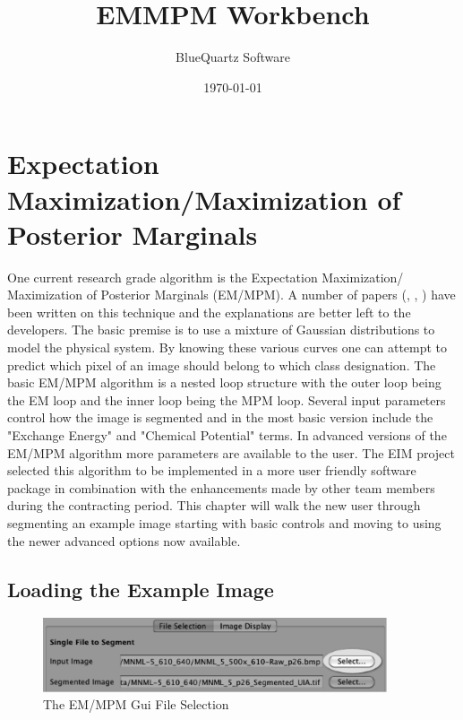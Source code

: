 \documentclass[12pt,oneside]{book}
\title{EMMPM Workbench}
\author{BlueQuartz Software}
\date{\today}
\begin{document}
\maketitle
    


{}
\tableofcontents
{}
\hypersetup{pageanchor=true}


\chapter{Expectation Maximization/Maximization of Posterior Marginals}
\label{Expectation Maximization/Maximization of Posterior Marginals}
\hypertarget{Expectation Maximization/Maximization of Posterior Marginals}{}


One current research grade algorithm is the Expectation Maximization/ Maximization of Posterior Marginals (EM/MPM). A number of papers (\cite{1}, \cite{2}, \cite{3}) have been written on this technique and the explanations are better left to the developers. The basic premise is to use a mixture of Gaussian distributions to model the physical system. By knowing these various curves one can attempt to predict which pixel of an image should belong to which class designation. The basic EM/MPM algorithm is a nested loop structure with the outer loop being the EM loop and the inner loop being the MPM loop. Several input parameters control how the image is segmented and in the most basic version include the "Exchange Energy" and "Chemical Potential" terms. In advanced versions of the EM/MPM algorithm more parameters are available to the user. The EIM project selected this algorithm to be implemented in a more user friendly software package in combination with the enhancements made by other team members during the contracting period. This chapter will walk the new user through segmenting an example image starting with basic controls and moving to using the newer advanced options now available.


\section{Loading the Example Image}
\begin{figure}[htbp]
\begin{center}
\includegraphics[width=4.0in]{images/Untitled1.png}
\caption{The EM/MPM Gui File Selection}
\label{image1}
\end{center}
\end{figure}
\end{document}
